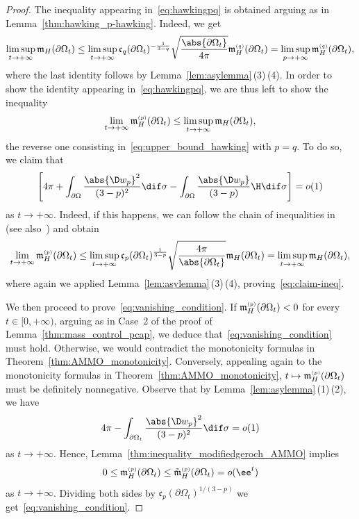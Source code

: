 \documentclass[10pt,a4paper]{amsart}
\numberwithin{equation}{section}
\renewcommand{\ncapa}{\mathfrak{c}}
\newcommand{\ma}{\mathfrak{m}}
\newcommand{\tp}[1][p]{{\text{\tiny$(#1)$}}}
\begin{document}
\begin{proof} The inequality appearing in~\eqref{eq:hawkingpq} is obtained arguing as in Lemma~\ref{thm:hawking_p-hawking}. Indeed, we get%
\begin{equation} \label{eq:upper_bound_hawking}
\limsup_{t \to +\infty} \ma_H(\partial \Omega_t) \leq \limsup_{t \to +\infty} \ncapa_q(\partial \Omega_t)^{-\frac{1}{3-q}}\sqrt{\frac{\abs{ \partial \Omega_t}}{4\pi}}\ma_H^{\tp[q]} (\partial \Omega_t)=\limsup_{p \to +\infty} \ma^{\tp[q]}_H(\partial \Omega_t),
\end{equation}
where the last identity follows by Lemma~\ref{lem:asylemma}\,(3)\,(4). In order to show the identity appearing in~\eqref{eq:hawkingpq}, we are thus left to show the inequality
\begin{equation}
\label{eq:claim-ineq}
 \lim_{t \to +\infty }\ma^{\tp}_H(\partial \Omega_t) \leq \limsup_{t \to +\infty} \ma_H(\partial \Omega_t),
\end{equation}
the reverse one consisting in~\eqref{eq:upper_bound_hawking} with $p = q$. To do so, we claim that
\begin{equation}\label{eq:vanishing_condition}
 \Bigg[4\pi + \int_{\partial \Omega}\frac{\abs{\D w_p}^2}{(3-p)^2}\dif \sigma - \int_{\partial \Omega}\frac{\abs{ \D w_p} }{(3-p)}\H \dif \sigma \Bigg]=o(1)
\end{equation}
as $t \to +\infty$. Indeed, if this happens, we can follow the chain of inequalities in~\cite[(2.12)]{agostiniani_riemannianpenroseinequalitynonlinear_2022} (see also~\cite[Theorem 4.11]{benatti_isoperimetricriemannianpenroseinequality_2022}) and obtain
\begin{equation*}%
 \lim_{t \to +\infty} \ma^{\tp}_H(\partial \Omega_t) \leq \limsup_{t \to +\infty} \ncapa_p(\partial \Omega_t)^{\frac{1}{3-p}}\sqrt{\frac{4\pi}{\abs{\partial \Omega_t}}} \ma_H(\partial \Omega_t)= \limsup_{t \to +\infty} \ma_H(\partial \Omega_t),
\end{equation*}
where again we applied Lemma~\ref{lem:asylemma}\,(3)\,(4), proving~\eqref{eq:claim-ineq}.

We then proceed to prove~\eqref{eq:vanishing_condition}.
If $\ma^{\tp}_H(\partial \Omega_t) <0$
 for every $t\in [0,+\infty)$, arguing as in Case~2 of the proof of Lemma~\ref{thm:mass_control_pcap}, we deduce that~\eqref{eq:vanishing_condition} must hold. Otherwise, we would contradict the monotonicity formulas in Theorem~\ref{thm:AMMO_monotonicity}. Conversely, appealing again to the monotonicity formulas in Theorem~\ref{thm:AMMO_monotonicity}, $t \mapsto \ma^{\tp}_H(\partial \Omega_t)$ must be definitely nonnegative. Observe that by
Lemma~\ref{lem:asylemma}\,(1)\,(2), we have
\[
4 \pi - \int_{\partial \Omega_t} \frac{ \abs{ \D w_p}^2}{(3-p)^2} \dif \sigma = o(1)
\]
as $t\to +\infty$. Hence, Lemma~\ref{thm:inequality_modifiedgeroch_AMMO} implies
\[
0\leq \ma^{\tp}_H(\partial \Omega_t) \leq \tilde{\ma}^{\tp}_H(\partial \Omega_t) = o(\ee^{t})
\]
as $t\to +\infty$. Dividing both sides by $\ncapa_p(\partial \Omega_t)^{1/(3-p)}$ we get~\eqref{eq:vanishing_condition}.
 \end{proof}
\end{document}

